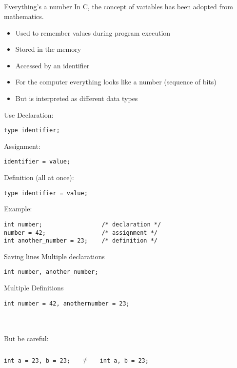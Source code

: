 \subsection{}
\begin{frame}{Everything's a number}
	In C, the concept of variables has been adopted from mathematics.
	\begin{itemize}
		\item Used to remember values during program execution
		\item Stored in the memory
		\item Accessed by an identifier
		\item For the computer everything looks like a number (sequence of bits)
		\item But is interpreted as different data types
	\end{itemize}
\end{frame}
\begin{frame}[fragile]{Use}
	Declaration:
	\begin{lstlisting}[numbers=none,basicstyle=\itshape\footnotesize]
type identifier;
\end{lstlisting}
	Assignment: 
	\begin{lstlisting}[numbers=none,basicstyle=\itshape\footnotesize]
identifier = value;
\end{lstlisting}
	Definition (all at once):
	\begin{lstlisting}[numbers=none,basicstyle=\itshape\footnotesize]
type identifier = value;
\end{lstlisting}
	Example:
	\begin{lstlisting}[numbers=none]
int number;					/* declaration */
number = 42;				/* assignment */
int another_number = 23;	/* definition */
\end{lstlisting}
\end{frame}
\begin{frame}[fragile]{Saving lines}
	Multiple declarations
	\begin{lstlisting}[numbers=none]
int number, another_number;
\end{lstlisting}
	Multiple Definitions
	\begin{lstlisting}[numbers=none]
int number = 42, anothernumber = 23;
\end{lstlisting}\ \\\ \\
But be careful:
\begin{columns}[c]
	\begin{lstlisting}[numbers=none]
int a = 23, b = 23;
\end{lstlisting}
	\centering
	$\neq$
	\begin{lstlisting}[numbers=none]
int a, b = 23;
\end{lstlisting}
	
\end{columns}
\end{frame}
